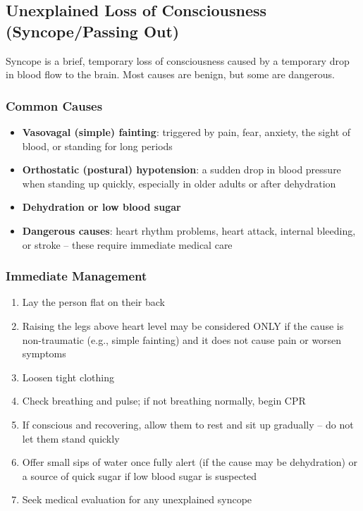 \subsection{Unexplained Loss of Consciousness (Syncope/Passing Out)}

Syncope is a brief, temporary loss of consciousness caused by a temporary drop in blood flow to the brain. Most causes are benign, but some are dangerous.

\subsubsection{Common Causes}

\begin{itemize}[leftmargin=*]
  \item \textbf{Vasovagal (simple) fainting}: triggered by pain, fear, anxiety, the sight of blood, or standing for long periods
  \item \textbf{Orthostatic (postural) hypotension}: a sudden drop in blood pressure when standing up quickly, especially in older adults or after dehydration
  \item \textbf{Dehydration or low blood sugar}
  \item \textbf{Dangerous causes}: heart rhythm problems, heart attack, internal bleeding, or stroke -- these require immediate medical care
\end{itemize}

\subsubsection{Immediate Management}

\begin{enumerate}[leftmargin=*]
  \item Lay the person flat on their back
  \item Raising the legs above heart level may be considered ONLY if the cause is non-traumatic (e.g., simple fainting) and it does not cause pain or worsen symptoms
  \item Loosen tight clothing
  \item Check breathing and pulse; if not breathing normally, begin CPR
  \item If conscious and recovering, allow them to rest and sit up gradually -- do not let them stand quickly
  \item Offer small sips of water once fully alert (if the cause may be dehydration) or a source of quick sugar if low blood sugar is suspected
  \item Seek medical evaluation for any unexplained syncope
\end{enumerate}
